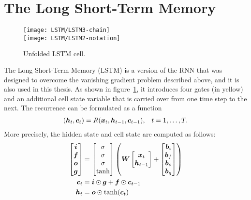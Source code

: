 	\section{The Long Short-Term Memory}
		\begin{figure}[tb]
			\centering
			\texttt{[image: LSTM/LSTM3-chain]}\\
			\vspace{5mm}
			\texttt{[image: LSTM/LSTM2-notation]}
			\caption[Unfolded LSTM cell]
					{Unfolded LSTM cell. 
					\imagecourtesycolah}
			\label{fig:LSTM3-chain}
		\end{figure}
		The Long Short-Term Memory (LSTM) is a version of the RNN that was designed to overcome the vanishing gradient problem described above, and it is also used in this thesis.
		As shown in figure~\ref{fig:LSTM3-chain}, it introduces four gates (in yellow) and an additional cell state variable that is carried over from one time step to the next.
		The recurrence can be formulated as a function 
		\begin{align}\label{eq:LSTM_recurrence}
			(\bm{h}_t, \bm{c}_t) = R(\bm{x}_t, \bm{h}_{t-1}, \bm{c}_{t-1}), & & t = 1, \dots, T.
		\end{align}
		More precisely, the hidden state and cell state are computed as follows:
		\begin{align}\label{eq:Vanilla-LSTM-Definition}
			\begin{split}
				\begin{bmatrix}
					\bm{i} \\ 
					\bm{f} \\ 
					\bm{o} \\ 
					\bm{g}
				\end{bmatrix}
				&=
				\begin{bmatrix}
					\sigma \\ 
					\sigma \\ 
					\sigma \\ 
					\tanh
				\end{bmatrix}
				\left(
				\bm{W}
				\begin{bmatrix}
					\bm{x}_t \\
					\bm{h}_{t-1}
				\end{bmatrix}
				+
				\begin{bmatrix}
					\bm{b}_i \\ 
					\bm{b}_f \\ 
					\bm{b}_o \\ 
					\bm{b}_g
				\end{bmatrix}
				\right)
				\\
				\bm{c}_t &= \bm{i} \odot \bm{g} + \bm{f} \odot \bm{c}_{t-1} \\
				\bm{h}_t &= \bm{o} \odot \tanh(\bm{c}_{t})
			\end{split}
		\end{align}
